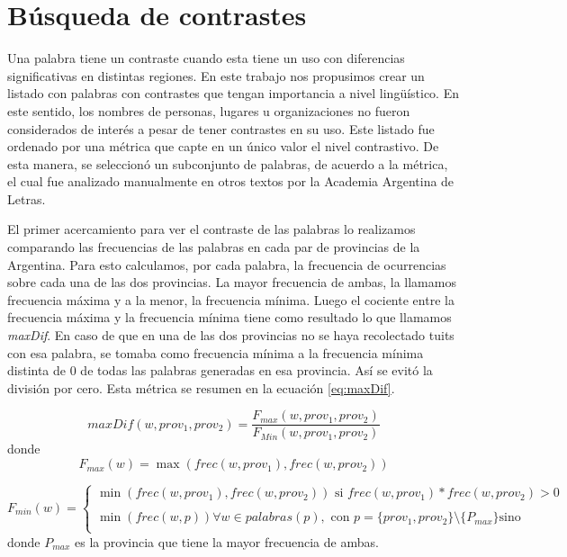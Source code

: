 \section{Búsqueda de contrastes}

Una palabra tiene un contraste cuando esta tiene un uso con diferencias significativas en
distintas regiones. En este trabajo nos propusimos crear un listado con palabras con contrastes que tengan
importancia a nivel lingüístico. En este sentido, los nombres de personas, lugares u organizaciones no 
fueron considerados de interés a pesar de tener contrastes en su uso.
Este listado fue ordenado por una métrica que capte en un único valor el nivel contrastivo. De esta manera, 
se seleccionó un subconjunto de palabras, de acuerdo a la métrica, el cual fue analizado manualmente en otros textos por la Academia Argentina de Letras.

El primer acercamiento para ver el contraste de las palabras lo realizamos comparando las frecuencias de las palabras 
en cada par de provincias de la Argentina. Para esto calculamos, por cada palabra, la frecuencia de ocurrencias sobre cada una de las dos provincias. La mayor frecuencia de ambas, la llamamos frecuencia máxima y a la menor, la frecuencia mínima. Luego el cociente entre la frecuencia máxima y la frecuencia mínima tiene como resultado lo que llamamos \textit{maxDif}. En caso de que en una de las dos provincias no se haya 
recolectado tuits con esa palabra, se tomaba como frecuencia mínima a la frecuencia mínima distinta de 0 de todas las palabras generadas en esa provincia. Así se evitó la división por cero. Esta métrica se resumen en la ecuación \ref{eq:maxDif}.


\begin{equation}
  \label{eq:maxDif} 
  maxDif(w,prov_1,prov_2) = \frac{F_{max}(w,prov_1,prov_2)}{F_{Min}(w,prov_1,prov_2)}
\end{equation}
donde 
\begin{equation}
F_{max}(w) = \max(frec(w,prov_1),frec(w,prov_2))
\end{equation}

\begin{equation}
 F_{min}(w) = \left\{ \begin{array}{ll}
             \min(frec(w,prov_1),frec(w,prov_2))  \text{ si } frec(w,prov_1) * frec(w,prov_2) > 0  & \\
             \\\min(frec(w,p)) \forall w \in palabras(p) , \text{ con } p=\{prov_1,prov_2\} \setminus \{P_{max}\} \text{sino} &  \\
             \end{array}
   \right.
\end{equation}
   donde $P_{max}$ es la provincia que tiene la mayor frecuencia de ambas.\\



